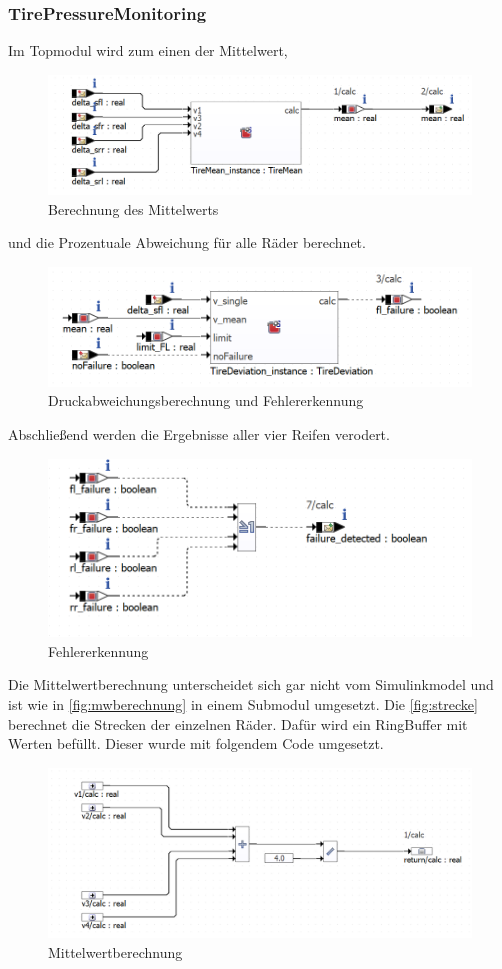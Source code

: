 \subsubsection{TirePressureMonitoring}
Im Topmodul wird zum einen der Mittelwert,
\begin{figure}[H]
	\centering
	\includegraphics[width=0.7\linewidth]{../Graphiken/mean}
	\caption{Berechnung des Mittelwerts}
	\label{fig:Simittelm}
\end{figure}
und die Prozentuale Abweichung für alle Räder berechnet.
\begin{figure}[H]
	\centering
	\includegraphics[width=0.7\linewidth]{../Graphiken/deviation}
	\caption{Druckabweichungsberechnung und Fehlererkennung}
	\label{fig:abweichung}
\end{figure}
Abschließend werden die Ergebnisse aller vier Reifen verodert.
\begin{figure}[H]
	\centering
	\includegraphics[width=0.7\linewidth]{../Graphiken/or}
	\caption{Fehlererkennung}
	\label{fig:fehler}
\end{figure}
Die Mittelwertberechnung unterscheidet sich gar nicht vom Simulinkmodel und ist wie in \autoref{fig:mwberechnung} in einem Submodul umgesetzt.
Die \autoref{fig:strecke} berechnet die Strecken der einzelnen Räder. Dafür wird ein RingBuffer mit Werten befüllt. Dieser wurde mit folgendem Code umgesetzt.
\begin{figure}[H]
	\centering
	\includegraphics[width=0.8\linewidth]{../Graphiken/meanCalc}
	\caption{Mittelwertberechnung}
	\label{fig:mwberechnung}
\end{figure}
